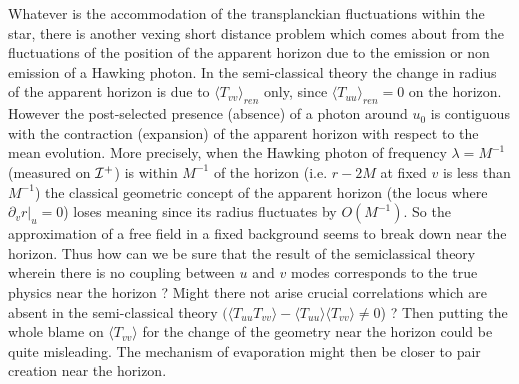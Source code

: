 \documentclass[12pt,oneside]{report}
\def\la{\lambda}
\begin{document}
Whatever is the accommodation of the transplanckian fluctuations
within the star, there is another vexing short distance problem
which comes about from the fluctuations of the position of the
apparent horizon due to the emission or non emission of a Hawking
photon. In the
semi-classical theory the change in radius of the apparent horizon
is due to $\langle T_{vv} \rangle_{ren}$ only,
since $\langle T_{uu} \rangle_{ren}=0 $ on the horizon.
 However the post-selected presence (absence) of a photon 
around $u_0$ 
is contiguous with the contraction (expansion) of the apparent
horizon with respect to the mean evolution.
More precisely, when the
Hawking photon of frequency  $\la =M^{-1}$ (measured on $\cal I ^+$)
 is within $M^{-1}$
of the horizon (i.e. $r-2M$ at fixed $v$ is 
less than $
M^{-1}$) 
the classical geometric concept of the apparent 
horizon (the locus where $\partial
_v r\vert_u = 0$) 
loses meaning since its radius fluctuates by $O(M^{-1})$.
So the approximation of a free field in a fixed background seems to break down
near the horizon. Thus how can we be sure that the result of the semiclassical
theory wherein
there is no coupling between $u$ and $v$ modes
corresponds to the true physics near the horizon ?
Might there not arise crucial 
correlations which are absent in the semi-classical
theory $(\langle T_{uu}T_{vv} \rangle - 
\langle T_{uu} \rangle
\langle T_{vv} \rangle \neq 0$) ?
 Then putting the whole blame on
$\langle T_{vv} \rangle$ for the change of the geometry near the horizon
could be quite misleading. The mechanism of evaporation
might then be closer to pair creation near the horizon.
\end{document}
